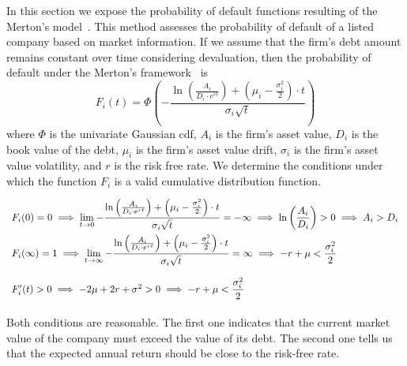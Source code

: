 \documentclass[11pt,fleqn]{book} %
\begin{document}
In this section we expose the probability of default functions resulting of the
Merton's model~\cite[sec. 3.3]{bluhm:2002}. This method assesses the probability 
of default of a listed company based on market information. 
If we assume that the firm's debt amount remains constant over time considering 
devaluation, then the probability of default under the Merton's 
framework~\cite{kmv:2003} is
\begin{displaymath}
	F_i(t) = \Phi\left( -\frac{\ln\left(\frac{A_i}{D_i \cdot e^{rt}} \right) + 
	\left(\mu_i-\frac{\sigma_{i}^2}{2}\right)\cdot t}{\sigma_{i}\sqrt{t}}\right)
\end{displaymath}
where $\Phi$ is the univariate Gaussian cdf, $A_i$ is the firm's asset value, 
$D_i$ is the book value of the debt, $\mu_i$ is the firm's asset value drift, 
$\sigma_i$ is the firm's asset value volatility, and $r$ is the risk free rate. 
We determine the conditions under which the function $F_i$ is a valid cumulative 
distribution function.
\begin{displaymath}
	\def\arraystretch{3.0}
	\begin{array}{l}
		F_i(0) = 0 
		\implies 
		\displaystyle\lim_{t \to 0} -\frac{\ln\left(\frac{A_i}{D_i \cdot e^{rt}} \right) + 
		\left(\mu_i-\frac{\sigma_{i}^2}{2}\right)\cdot t}{\sigma_{i}\sqrt{t}} = -\infty
		\implies
		\ln\left(\frac{A_i}{D_i}\right) > 0
		\implies
		A_i > D_i
		\\
		F_i(\infty) = 1
		\implies 
		\displaystyle\lim_{t \to \infty} -\frac{\ln\left(\frac{A_i}{D_i \cdot e^{rt}} \right) + 
		\left(\mu_i-\frac{\sigma_{i}^2}{2}\right)\cdot t}{\sigma_{i}\sqrt{t}} = \infty
		\implies
		-r + \mu < \frac{\sigma_i^2}{2}
		\\
		F_i'(t) > 0 
		\implies 
		-2 \mu + 2 r + \sigma^2 > 0 
		\implies 
		\displaystyle-r + \mu < \frac{\sigma_i^2}{2}
	\end{array}
\end{displaymath}

Both conditions are reasonable. The first one indicates that the current market 
value of the company must exceed the value of its debt. The second one tells us 
that the expected annual return should be close to the risk-free rate.
\end{document}
